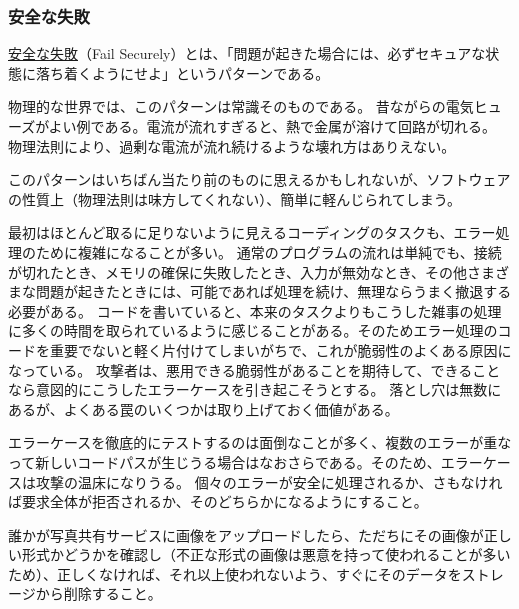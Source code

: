 \documentclass[uplatex]{jsarticle}
\def\label#1{}%
\begin{document}
\subsubsection{安全な失敗}

\begin{dfn}[安全な失敗]\label{dfn:ch4-fail-securely}
\underline{安全な失敗}（Fail Securely）とは、「問題が起きた場合には、必ずセキュアな状態に落ち着くようにせよ」というパターンである。
\end{dfn}

\begin{exa}[電気ヒューズ]\label{exa:ch4-fuse}
物理的な世界では、このパターンは常識そのものである。
昔ながらの電気ヒューズがよい例である。電流が流れすぎると、熱で金属が溶けて回路が切れる。
物理法則により、過剰な電流が流れ続けるような壊れ方はありえない。
\end{exa}

このパターンはいちばん当たり前のものに思えるかもしれないが、ソフトウェアの性質上（物理法則は味方してくれない）、簡単に軽んじられてしまう。

最初はほとんど取るに足りないように見えるコーディングのタスクも、エラー処理のために複雑になることが多い。
通常のプログラムの流れは単純でも、接続が切れたとき、メモリの確保に失敗したとき、入力が無効なとき、その他さまざまな問題が起きたときには、可能であれば処理を続け、無理ならうまく撤退する必要がある。
コードを書いていると、本来のタスクよりもこうした雑事の処理に多くの時間を取られているように感じることがある。そのためエラー処理のコードを重要でないと軽く片付けてしまいがちで、これが脆弱性のよくある原因になっている。
攻撃者は、悪用できる脆弱性があることを期待して、できることなら意図的にこうしたエラーケースを引き起こそうとする。
落とし穴は無数にあるが、よくある罠のいくつかは取り上げておく価値がある。

エラーケースを徹底的にテストするのは面倒なことが多く、複数のエラーが重なって新しいコードパスが生じうる場合はなおさらである。そのため、エラーケースは攻撃の温床になりうる。
個々のエラーが安全に処理されるか、さもなければ要求全体が拒否されるか、そのどちらかになるようにすること。

\begin{exa}[写真共有サービスへの画像アップロード]\label{exa:ch4-image-upload}
誰かが写真共有サービスに画像をアップロードしたら、ただちにその画像が正しい形式かどうかを確認し（不正な形式の画像は悪意を持って使われることが多いため）、正しくなければ、それ以上使われないよう、すぐにそのデータをストレージから削除すること。
\end{exa}
\end{document}
